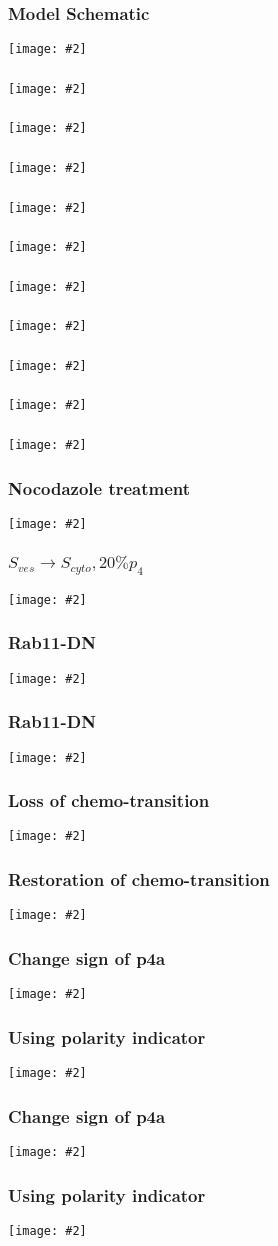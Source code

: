 \documentclass{beamer}
\newcommand{\plotslide}[2]{
  \begin{frame}
    \frametitle{#1}
    \centering
    \texttt{[image: \#2]}
  \end{frame}
}
\begin{document}
\plotslide{Model Schematic}{../tikz/flow.pdf}

\plotslide{}{StotVsMAPKpp.pdf}

\plotslide{}{SmemVsp3.pdf}

\plotslide{}{../hao/dose_response_ERK_t.png}
\plotslide{}{InputVsMAPKpp.pdf}

\plotslide{}{../hao/dose_response_MI_t.png}
\plotslide{}{InputVsMI.pdf}

\plotslide{}{../hao/exp-MIvsS_t.png}
\plotslide{}{ScaffoldVsMAPKppMI.pdf}

\plotslide{}{../hao/gradient_response_t.png}
\plotslide{}{GradientVsMI.pdf}

\plotslide{Nocodazole treatment}{../hao/noco_t.png}
\plotslide{$S_{ves} \rightarrow S_{cyto}, 20\%  p_4 $}{noco.pdf}

\plotslide{Rab11-DN}{../hao/Rab11DN_t.png}
\plotslide{Rab11-DN}{rab11dn.pdf}

\plotslide{Loss of chemo-transition}{MI_Amp_comparison.pdf}

\plotslide{Restoration of chemo-transition}{p4a_sign_change.pdf}

\plotslide{Change sign of p4a}{polarity_indicator_1.pdf}
\plotslide{Using polarity indicator}{sig_pol_ind.pdf}

\plotslide{Change sign of p4a}{polarity_indicator_2.pdf}
\plotslide{Using polarity indicator}{sig_pol_ind_2.pdf}
\end{document}
